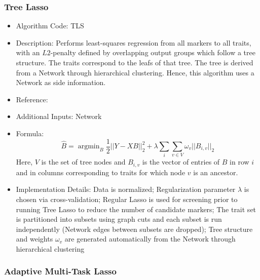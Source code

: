 \documentclass{article}
\newcommand{\argmin}{\operatorname{argmin}}
\begin{document}
\subsubsection{Tree Lasso}

\begin{itemize}
\item Algorithm Code: TLS
\item Description: Performs least-squares regression from all markers to all traits, with an $L2$-penalty defined by overlapping output groups which follow a tree structure. The traits correspond to the leafs of that tree. The tree is derived from a Network through hierarchical clustering. Hence, this algorithm uses a Network as side information.
\item Reference: \cite{TreeLasso}
\item Additional Inputs: Network
\item Formula:
\begin{equation*}
\hat{B} = \argmin_{B} \frac{1}{2}||Y - XB||_2^2 + \lambda \sum_i \sum_{v \in V} \omega_v ||B_{i,v}||_2
\end{equation*}
Here, $V$ is the set of tree nodes and $B_{i,v}$ is the vector of entries of $B$ in row $i$ and in columns corresponding to traits for which node $v$ is an ancestor.
\item Implementation Details: Data is normalized; Regularization parameter $\lambda$ is chosen via cross-validation; Regular Lasso is used for screening prior to running Tree Lasso to reduce the number of candidate markers; The trait set is partitioned into subsets using graph cuts and each subset is run independently (Network edges between subsets are dropped); Tree structure and weights $\omega_v$ are generated automatically from the Network through hierarchical clustering
\end{itemize}

\subsubsection{Adaptive Multi-Task Lasso}
\end{document}
